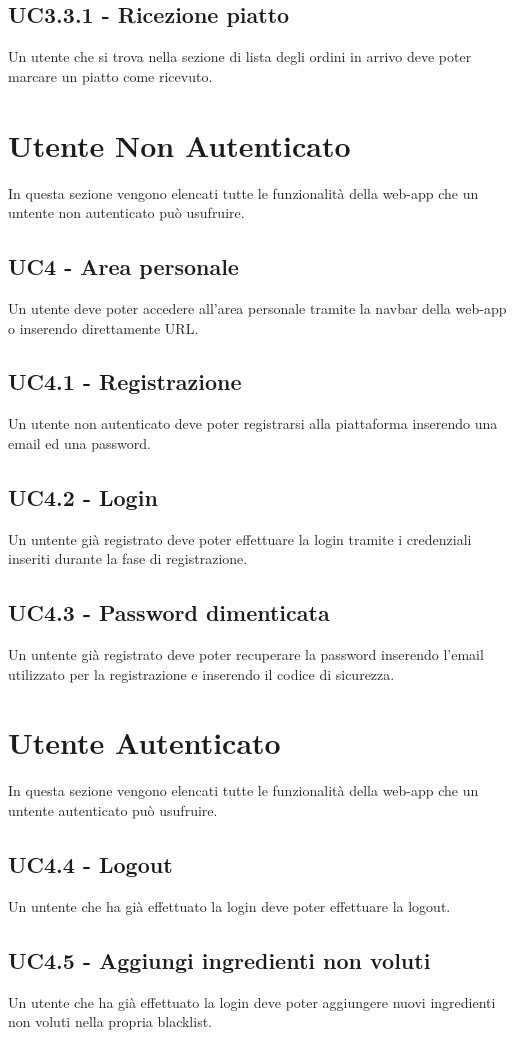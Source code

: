 \subsection{UC3.3.1 - Ricezione piatto}
Un utente che si trova nella sezione di lista degli ordini in arrivo deve poter marcare un piatto come ricevuto.
\section{Utente Non Autenticato}
In questa sezione vengono elencati tutte le funzionalità della web-app che un untente non autenticato può usufruire.
\subsection{UC4 - Area personale}
Un utente deve poter accedere all'area personale tramite la navbar della web-app o inserendo direttamente URL.
\subsection{UC4.1 - Registrazione}
Un utente non autenticato deve poter registrarsi alla piattaforma inserendo una email ed una password.
\subsection{UC4.2 - Login}
Un untente già registrato deve poter effettuare la login tramite i credenziali inseriti durante la fase di registrazione.
\subsection{UC4.3 - Password dimenticata}
Un untente già registrato deve poter recuperare la password inserendo l'email utilizzato per la registrazione e inserendo il codice di sicurezza.
\section{Utente Autenticato}
In questa sezione vengono elencati tutte le funzionalità della web-app che un untente autenticato può usufruire.
\subsection{UC4.4 - Logout}
Un untente che ha già effettuato la login deve poter effettuare la logout.
\subsection{UC4.5 - Aggiungi ingredienti non voluti}
Un utente che ha già effettuato la login deve poter aggiungere nuovi ingredienti non voluti nella propria blacklist.
